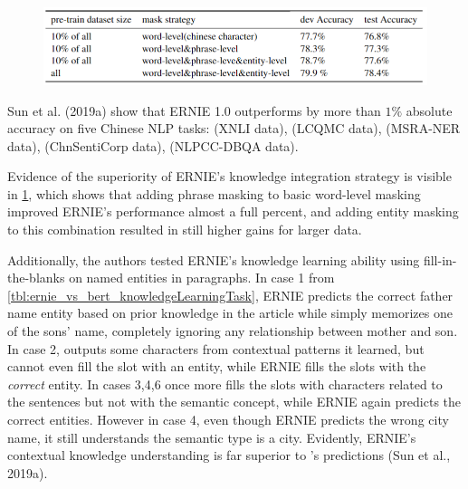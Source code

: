 {
\begin{figure}
\begin{center}
    \vspace{-30pt}
    \includegraphics[width=\linewidth]{imgs/ernie_tableAblation.png}
\end{center}
\vspace{-20pt}
\label{tbl:ernie_ablationStudy}
\end{figure}

Sun et al. (2019a) show that ERNIE 1.0 outperforms  by more than $1 \%$ absolute accuracy on five Chinese NLP tasks:  (XNLI data),  (LCQMC data),  (MSRA-NER data),  (ChnSentiCorp data),  (NLPCC-DBQA data).

Evidence of the superiority of ERNIE's knowledge integration strategy is visible in \cref{tbl:ernie_ablationStudy}, which shows that adding phrase masking to basic word-level masking improved ERNIE's performance almost a full percent, and adding entity masking to this combination resulted in still higher gains for larger data.
}



Additionally, the authors tested ERNIE's knowledge learning ability using fill-in-the-blanks on named entities in paragraphs. In case 1 from \cref{tbl:ernie_vs_bert_knowledgeLearningTask}, ERNIE predicts the correct father name entity based on prior knowledge in the article while  simply memorizes one of the sons' name, completely ignoring any relationship between mother and son. In case 2,  outputs some characters from contextual patterns it learned, but cannot even fill the slot with an entity, while ERNIE fills the slots with the \emph{correct} entity. In cases 3,4,6  once more fills the slots with characters related to the sentences but not with the semantic concept, while ERNIE again predicts the correct entities. However in case 4, even though ERNIE predicts the wrong city name, it still understands the semantic type is a city. Evidently, ERNIE's contextual knowledge understanding is far superior to 's predictions (Sun et al., 2019a). 



